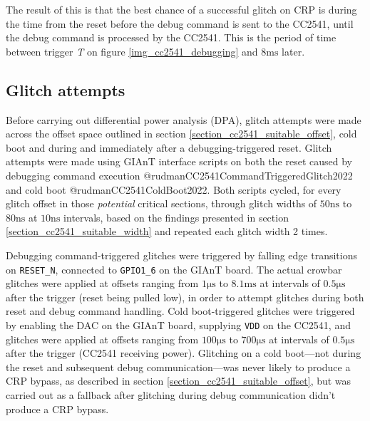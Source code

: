 The result of this is that the best chance of a successful glitch on CRP
is during the time from the reset before the debug command is sent to
the CC2541, until the debug command is processed by the CC2541. This is
the period of time between trigger \emph{T} on figure
\ref{img_cc2541_debugging} and \(8\si{\milli\second}\) later.

\hypertarget{glitch-attempts}{%
\subsection{\texorpdfstring{Glitch
attempts\label{section_cc2541_glitch_attempts}}{Glitch attempts}}\label{glitch-attempts}}

Before carrying out differential power analysis (DPA), glitch attempts
were made across the offset space outlined in section
\ref{section_cc2541_suitable_offset}, cold boot and during and
immediately after a debugging-triggered reset. Glitch attempts were made
using GIAnT interface scripts on both the reset caused by debugging
command execution @rudmanCC2541CommandTriggeredGlitch2022 and cold boot
@rudmanCC2541ColdBoot2022. Both scripts cycled, for every glitch offset
in those \emph{potential} critical sections, through glitch widths of
\(50\si{\nano\second}\) to \(80\si{\nano\second}\) at
\(10\si{\nano\second}\) intervals, based on the findings presented in
section \ref{section_cc2541_suitable_width} and repeated each glitch
width 2 times.

Debugging command-triggered glitches were triggered by falling edge
transitions on \texttt{RESET\_N}, connected to \texttt{GPIO1\_6} on the
GIAnT board. The actual crowbar glitches were applied at offsets ranging
from \(1\si{\micro\second}\) to \(8.1\si{\milli\second}\) at intervals
of \(0.5\si{\micro\second}\) after the trigger (reset being pulled low),
in order to attempt glitches during both reset and debug command
handling. Cold boot-triggered glitches were triggered by enabling the
DAC on the GIAnT board, supplying \texttt{VDD} on the CC2541, and
glitches were applied at offsets ranging from \(100\si{\micro\second}\)
to \(700\si{\micro\second}\) at intervals of \(0.5\si{\micro\second}\)
after the trigger (CC2541 receiving power). Glitching on a cold
boot---not during the reset and subsequent debug communication---was
never likely to produce a CRP bypass, as described in section
\ref{section_cc2541_suitable_offset}, but was carried out as a fallback
after glitching during debug communication didn't produce a CRP bypass.

